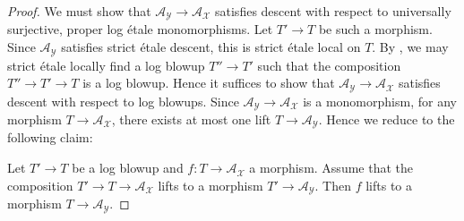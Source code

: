 \documentclass[11pt]{amsart}
\theoremstyle{definition}
\theoremstyle{remark}
\begin{document}
\begin{proof}
	We must show that $\mathcal{A}_{\mathcal{Y}}\to \mathcal{A}_{\mathcal{X}}$ satisfies descent with respect to universally surjective,
	proper log étale monomorphisms.
	Let $T'\to T$ be such a morphism. Since $\mathcal{A}_{\mathcal{Y}}$
	satisfies strict étale descent, this is strict étale local on $T$.
	By \cite[Remark 2.7 (2)]{Grothendieck_to_Hu_Xi_2025}, we may strict
	étale locally find a log blowup $T''\to T'$ such that the composition
	$T''\to T'\to T$ is a log blowup. Hence it suffices to show that $\mathcal{A}_{\mathcal{Y}}\to \mathcal{A}_{\mathcal{X}}$
	satisfies descent with respect to log blowups. Since $\mathcal{A}_{\mathcal{Y}}\to \mathcal{A}_{\mathcal{X}}$ is
	a monomorphism, for any morphism $T\to \mathcal{A}_{\mathcal{X}}$, there exists at most one lift
	$T\to \mathcal{A}_{\mathcal{Y}}$. Hence we reduce to the following claim:

	Let $T'\to T$ be a log blowup and $f:T\to \mathcal{A}_{\mathcal{X}}$ a morphism. Assume that the composition
	$T'\to T\to \mathcal{A}_{\mathcal{X}}$ lifts to a morphism $T'\to \mathcal{A}_{\mathcal{Y}}$. Then
	$f$ lifts to a morphism $T\to \mathcal{A}_{\mathcal{Y}}$.


\end{proof}
\end{document}
